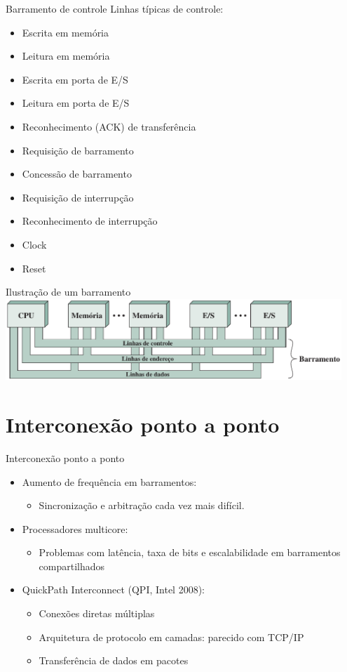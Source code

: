 \begin{slide}{Barramento de controle}
	Linhas típicas de controle:
	\begin{itemize}
		\item Escrita em memória
		\item Leitura em memória
		\item Escrita em porta de E/S
		\item Leitura em porta de E/S
		\item Reconhecimento (ACK) de transferência
		\item Requisição de barramento
		\item Concessão de barramento
		\item Requisição de interrupção
		\item Reconhecimento de interrupção
		\item Clock
		\item Reset
	\end{itemize}
\end{slide}

\begin{slide}{Ilustração de um barramento}
   \centering
   \includegraphics[width=0.95\textwidth]{figs/3-16}
\end{slide}

\section[slide=true]{Interconexão ponto a ponto}
\begin{slide}{Interconexão ponto a ponto}
\begin{itemize}
   \item Aumento de frequência em barramentos:
	   \begin{itemize}
		   \item Sincronização e arbitração cada vez mais difícil.
	   \end{itemize}
   \item Processadores multicore:
	   \begin{itemize}
		   \item Problemas com latência, taxa de bits e escalabilidade em barramentos compartilhados
	   \end{itemize}
   \item QuickPath Interconnect (QPI, Intel 2008):
	   \begin{itemize}
		   \item Conexões diretas múltiplas
		   \item Arquitetura de protocolo em camadas: parecido com TCP/IP
		   \item Transferência de dados em pacotes
	   \end{itemize}
   \end{itemize}
\end{slide}

